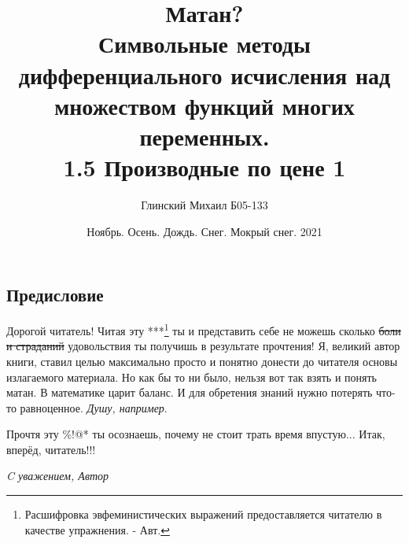 \documentclass{report}
\title{\textbf{\Huge Матан?}\\ {\LARGE Символьные методы дифференциального исчисления над множеством функций многих переменных.}\\ {\small 1.5 Производные по цене 1}}
\author{Глинский Михаил Б05-133 }
\date{Ноябрь. Осень. Дождь. Снег. Мокрый снег. 2021}
\begin{document}
\maketitle
\vspace*{\fill}
\begin{center}
\section*{Предисловие}
\end{center}
\vspace*{\fill}
Дорогой читатель! Читая эту ***\footnote{Расшифровка эвфеминистических выражений предоставляется читателю в качестве упражнения. - Авт.} ты и представить себе не можешь сколько \sout{боли и страданий} удовольствия ты получишь в результате прочтения!
Я, великий автор книги, ставил целью максимально просто и понятно донести до читателя основы излагаемого материала.
Но как бы то ни было, нельзя вот так взять и понять матан. В математике царит баланс. И для обретения знаний нужно потерять что-то равноценное. \textit{Душу, например}.

Прочтя эту \%!@* ты осознаешь, почему не стоит трать время впустую... Итак, вперёд, читатель!!!

\begin{flushright}
\textit{C уважением, Автор}
\end{flushright}
\vspace*{\fill}
\tableofcontents
\end{document}
